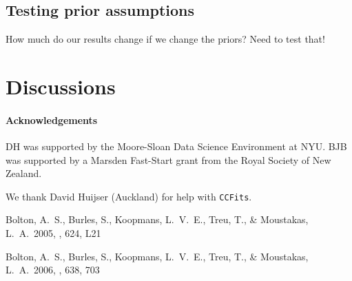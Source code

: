 \documentclass[12pt]{emulateapj}
\begin{document}
\subsection{Testing prior assumptions}

How much do our results change if we change the priors? Need to test that!

\section{Discussions}



\paragraph{Acknowledgements}
DH was supported by the Moore-Sloan Data Science Environment at NYU.
BJB was supported by a Marsden Fast-Start grant from the Royal Society of
New Zealand.

We thank David Huijser (Auckland) for help with {\tt CCFits}.



\begin{thebibliography}{999}

 Bolton, A.~S., Burles, 
S., Koopmans, L.~V.~E., Treu, T., 
\& Moustakas, L.~A.\ 2005, \apjl, 624, L21 

 Bolton, A.~S., Burles, 
S., Koopmans, L.~V.~E., Treu, T., \& Moustakas, L.~A.\ 2006, \apj, 638, 703 

\end{thebibliography}
\end{document}
